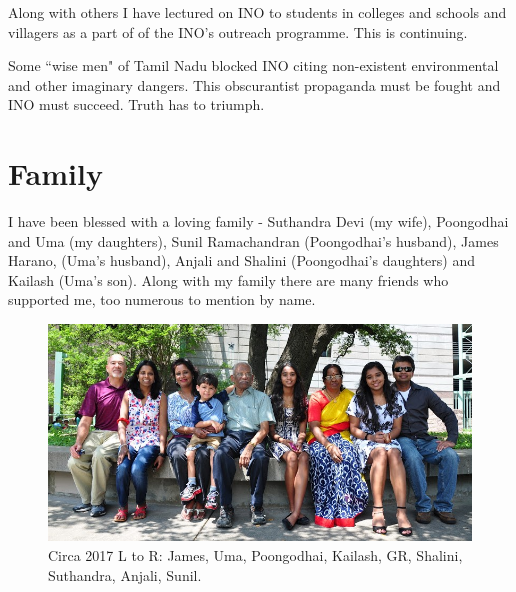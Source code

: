 Along with others I have lectured on INO to students in colleges and 
schools and villagers as a part of of the INO's outreach programme. This 
is continuing.
\medskip
  
Some ``wise men" of Tamil Nadu blocked INO citing non-existent 
environmental and other imaginary dangers. This obscurantist propaganda 
must be fought and INO must succeed. Truth has to triumph.
\medskip


\section*{Family}

I have been blessed with a loving family - Suthandra Devi (my wife), 
Poongodhai and Uma (my daughters), Sunil Ramachandran (Poongodhai's 
husband), James Harano, (Uma's husband), Anjali and Shalini 
(Poongodhai's daughters) and Kailash (Uma's son).
Along with my family there are many friends who supported me, too 
numerous to mention by name.
\bigskip

\begin{figure}[h]
\centering
\includegraphics[width=\textwidth]{images/Rajaji-family-1.jpg}
\caption{Circa 2017 L to R: James, Uma, Poongodhai, Kailash, GR, 
Shalini, Suthandra, Anjali, Sunil.}
\end{figure}

